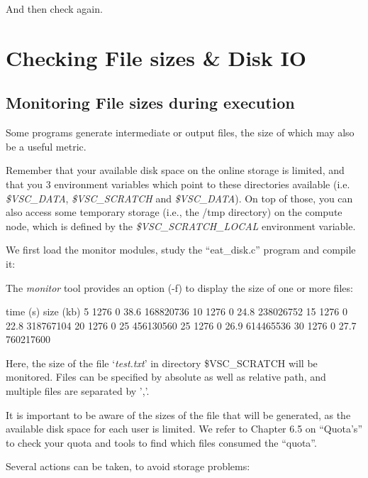 And then check again.

\section{Checking File sizes \& Disk IO}

\subsection{Monitoring File sizes during execution}

Some programs generate intermediate or output files, the size of which may also
be a useful metric.

Remember that your available disk space on the \hpc online storage is limited,
and that you 3 environment variables which point to these directories available
(i.e. \emph{\$VSC\_DATA}, \emph{\$VSC\_SCRATCH} and \emph{\$VSC\_DATA}).
On top of those, you can also access some temporary storage (i.e., the /tmp
directory) on the compute node, which is defined by the
\emph{\$VSC\_SCRATCH\_LOCAL} environment variable.

We first load the monitor modules, study the ``eat\_disk.c'' program and
compile it:

\begin{prompt}
\end{prompt}

The \emph{monitor} tool provides an option (-f) to display the size of one or
more files:

\begin{prompt}
time (s) size (kb) %
5  1276  0 38.6 168820736
10  1276  0 24.8 238026752
15  1276  0 22.8 318767104
20  1276  0 25 456130560
25  1276  0 26.9 614465536
30  1276  0 27.7 760217600
\end{prompt}

Here, the size of the file `\emph{test.txt}' in directory \$VSC\_SCRATCH will
be monitored. Files can be specified by absolute as well as relative path, and
multiple files are separated by ','.

It is important to be aware of the sizes of the file that will be generated, as
the available disk space for each user is limited.  We refer to Chapter 6.5 on
``Quota's'' to check your quota and tools to find which files consumed the
``quota''.

Several actions can be taken, to avoid storage problems:

